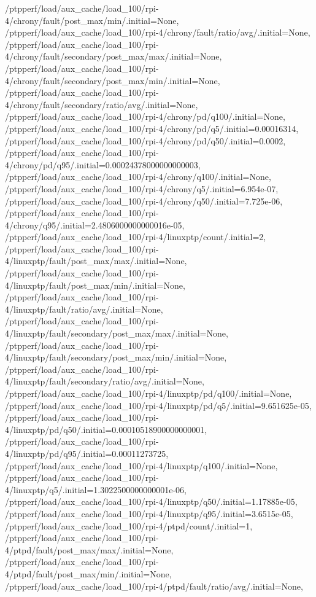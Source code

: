 {    /ptpperf/load/aux_cache/load_100/rpi-4/chrony/fault/post_max/min/.initial=None,
    /ptpperf/load/aux_cache/load_100/rpi-4/chrony/fault/ratio/avg/.initial=None,
    /ptpperf/load/aux_cache/load_100/rpi-4/chrony/fault/secondary/post_max/max/.initial=None,
    /ptpperf/load/aux_cache/load_100/rpi-4/chrony/fault/secondary/post_max/min/.initial=None,
    /ptpperf/load/aux_cache/load_100/rpi-4/chrony/fault/secondary/ratio/avg/.initial=None,
    /ptpperf/load/aux_cache/load_100/rpi-4/chrony/pd/q100/.initial=None,
    /ptpperf/load/aux_cache/load_100/rpi-4/chrony/pd/q5/.initial=0.00016314,
    /ptpperf/load/aux_cache/load_100/rpi-4/chrony/pd/q50/.initial=0.0002,
    /ptpperf/load/aux_cache/load_100/rpi-4/chrony/pd/q95/.initial=0.00024378000000000003,
    /ptpperf/load/aux_cache/load_100/rpi-4/chrony/q100/.initial=None,
    /ptpperf/load/aux_cache/load_100/rpi-4/chrony/q5/.initial=6.954e-07,
    /ptpperf/load/aux_cache/load_100/rpi-4/chrony/q50/.initial=7.725e-06,
    /ptpperf/load/aux_cache/load_100/rpi-4/chrony/q95/.initial=2.4806000000000016e-05,
    /ptpperf/load/aux_cache/load_100/rpi-4/linuxptp/count/.initial=2,
    /ptpperf/load/aux_cache/load_100/rpi-4/linuxptp/fault/post_max/max/.initial=None,
    /ptpperf/load/aux_cache/load_100/rpi-4/linuxptp/fault/post_max/min/.initial=None,
    /ptpperf/load/aux_cache/load_100/rpi-4/linuxptp/fault/ratio/avg/.initial=None,
    /ptpperf/load/aux_cache/load_100/rpi-4/linuxptp/fault/secondary/post_max/max/.initial=None,
    /ptpperf/load/aux_cache/load_100/rpi-4/linuxptp/fault/secondary/post_max/min/.initial=None,
    /ptpperf/load/aux_cache/load_100/rpi-4/linuxptp/fault/secondary/ratio/avg/.initial=None,
    /ptpperf/load/aux_cache/load_100/rpi-4/linuxptp/pd/q100/.initial=None,
    /ptpperf/load/aux_cache/load_100/rpi-4/linuxptp/pd/q5/.initial=9.651625e-05,
    /ptpperf/load/aux_cache/load_100/rpi-4/linuxptp/pd/q50/.initial=0.00010518900000000001,
    /ptpperf/load/aux_cache/load_100/rpi-4/linuxptp/pd/q95/.initial=0.00011273725,
    /ptpperf/load/aux_cache/load_100/rpi-4/linuxptp/q100/.initial=None,
    /ptpperf/load/aux_cache/load_100/rpi-4/linuxptp/q5/.initial=1.3022500000000001e-06,
    /ptpperf/load/aux_cache/load_100/rpi-4/linuxptp/q50/.initial=1.17885e-05,
    /ptpperf/load/aux_cache/load_100/rpi-4/linuxptp/q95/.initial=3.6515e-05,
    /ptpperf/load/aux_cache/load_100/rpi-4/ptpd/count/.initial=1,
    /ptpperf/load/aux_cache/load_100/rpi-4/ptpd/fault/post_max/max/.initial=None,
    /ptpperf/load/aux_cache/load_100/rpi-4/ptpd/fault/post_max/min/.initial=None,
    /ptpperf/load/aux_cache/load_100/rpi-4/ptpd/fault/ratio/avg/.initial=None,
}
